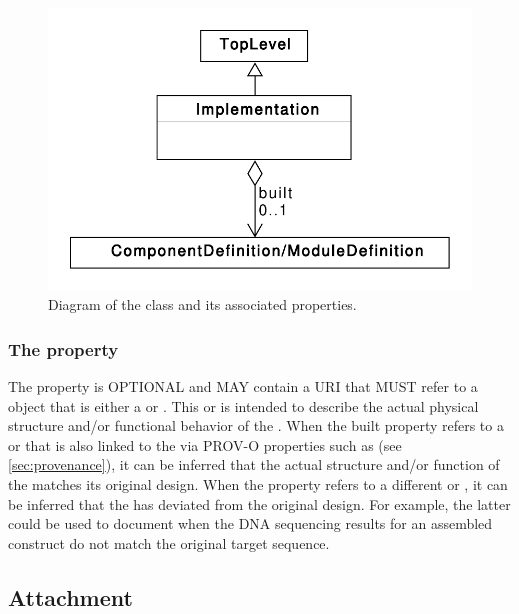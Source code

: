 \begin{figure}[ht]
\begin{center}
\includegraphics[scale=0.5]{uml/implementation}
\caption[]{Diagram of the  class and its associated properties.}
\label{uml:implementation}
\end{center}
\end{figure}

\subsubsection*{ The  property}\label{sec:built}
The  property is OPTIONAL and MAY contain a URI that MUST refer to a  object that is either a  or . This  or  is intended to describe the actual physical structure and/or functional behavior of the . When the built property refers to a  or  that is also linked to the  via PROV-O properties such as  (see \ref{sec:provenance}), it can be inferred that the actual structure and/or function of the  matches its original design. When the  property refers to a different  or , it can be inferred that the  has deviated from the original design. For example, the latter could be used to document when the DNA sequencing results for an assembled construct do not match the original target sequence.



\subsection{Attachment}
\label{sec:Attachment}

